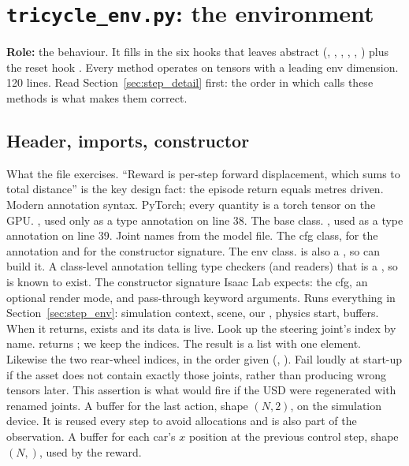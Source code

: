 \chapter{\texttt{tricycle\_env.py}: the environment}
\label{ch:env}

\textbf{Role:} the behaviour. It fills in the six hooks that
 leaves abstract (,
, , ,
, ) plus the reset hook
. Every method operates on tensors with a leading env
dimension. 120 lines. Read Section~\ref{sec:step_detail} first: the order in
which  calls these methods is what makes them correct.

\section{Header, imports, constructor}


\begin{explain}
 What the file exercises. ``Reward is per-step forward
  displacement, which sums to total distance'' is the key design fact: the
  episode return equals metres driven.
 Modern annotation syntax.
 PyTorch; every quantity is a torch tensor on the GPU.
 , used only as a type annotation on line 38.
 The base class.
 , used as a type annotation on line 39.
 Joint names from the model file.
 The cfg class, for the  annotation and for the
  constructor signature.
 The env class.  is also a , so
   can build it.
 A class-level annotation telling type checkers (and readers) that
   is a , so 
  is known to exist.
 The constructor signature Isaac Lab expects: the cfg, an optional
  render mode, and pass-through keyword arguments.
 Runs everything in Section~\ref{sec:step_env}: simulation context,
  scene, our , physics start, buffers. When it returns,
   exists and its data is live.
 Look up the steering joint's index by name.
   returns ; we keep the indices.
  The result is a list with one element.
 Likewise the two rear-wheel indices, in the order given
  (, ).
 Fail loudly at start-up if the asset does not contain exactly those
  joints, rather than producing wrong tensors later. This assertion is what
  would fire if the USD were regenerated with renamed joints.
 A buffer for the last action, shape $(N, 2)$, on the simulation
  device. It is reused every step to avoid allocations and is also part of
  the observation.
 A buffer for each car's $x$ position at the previous control step,
  shape $(N,)$, used by the reward.
\end{explain}

